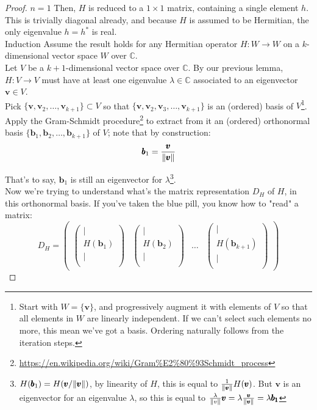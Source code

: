 \documentclass[solutions.tex]{subfiles}
\renewcommand{\bm}[1]{\pmb{#1}}
\begin{document}
\begin{proof}
$\boxed{n=1}$ Then, $H$ is reduced to a $1\times 1$ matrix, containing
a single element $h$. This is trivially diagonal already, and because
$H$ is assumed to be Hermitian, the only eigenvalue $h = h^*$ is real. \\

$\boxed{\text{Induction}}$ Assume the result holds for any Hermitian
operator $H : W \rightarrow W$ on a $k$-dimensional vector space $W$
over $\mathbb{C}$. \\

Let $V$ be a $k+1$-dimensional vector space over $\mathbb{C}$.
By our previous lemma, $H : V\rightarrow V$ must have at
least one eigenvalue $\lambda\in\mathbb{C}$ associated to an eigenvector
$\bm{v}\in V$. \\

Pick $\{\bm{v}, \bm{v}_2, \ldots, \bm{v}_{k+1} \} \subset V$
so that $\{\bm{v}, \bm{v}_2, \bm{v}_3, \ldots, \bm{v}_{k+1} \}$ is an
(ordered) basis of $V$\footnote{Start with $W=\{ \bm{v} \}$, and progressively
augment it with elements of $V$ so that all elements in $W$ are linearly
independent. If we can't select such elements no more, this mean we've
got a basis. Ordering naturally follows from the iteration steps.}. \\

Apply the Gram-Schmidt procedure\footnote{
\url{https://en.wikipedia.org/wiki/Gram\%E2\%80\%93Schmidt\_process}} to
extract from it an (ordered) orthonormal basis
$\{ \bm{b}_1, \bm{b}_2, \ldots, \bm{b}_{k+1} \}$ of $V$; note that
by construction:
\[
	\bm{b}_1 = \frac{\bm{v}}{\norm{\bm{v}}}
\]

That's to say, $\bm{b}_1$ is still an eigenvector for $\lambda$\footnote{
$H(\bm{b}_1) = H(\bm{v} / \norm{\bm{v}})$, by linearity of $H$,
this is equal to $\frac1{\norm{\bm{v}}}H(\bm{v})$. But $\bm{v}$ is
an eigenvector for an eigenvalue $\lambda$, so this is equal to
$\frac{\lambda}{\norm{v}}\bm{v} = \lambda\frac{\bm{v}}{\norm{\bm{v}}}
= \lambda\bm{b_1}$}. \\

Now we're trying to understand what's the matrix representation $D_H$ of $H$,
in this orthonormal basis. If you've taken the blue pill, you know how to
"read" a matrix:
\[
	D_H = \begin{pmatrix}
		\begin{pmatrix}
			\bigg\vert \\
			H(\bm{b}_1) \\
			\bigg\vert \\
		\end{pmatrix} &
		\begin{pmatrix}
			\bigg\vert \\
			H(\bm{b}_2) \\
			\bigg\vert \\
		\end{pmatrix} &
		\ldots &
		\begin{pmatrix}
			\bigg\vert \\
			H(\bm{b}_{k+1}) \\
			\bigg\vert \\
		\end{pmatrix}
	\end{pmatrix}
\]


\end{proof}
\end{document}
